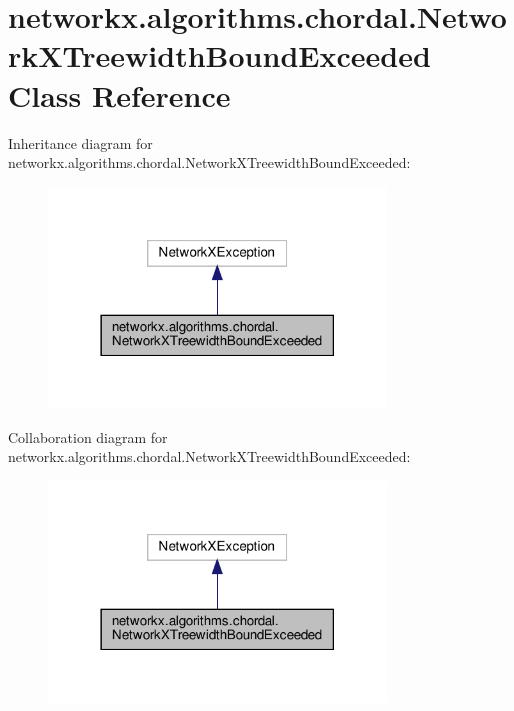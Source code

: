\hypertarget{classnetworkx_1_1algorithms_1_1chordal_1_1NetworkXTreewidthBoundExceeded}{}\section{networkx.\+algorithms.\+chordal.\+Network\+X\+Treewidth\+Bound\+Exceeded Class Reference}
\label{classnetworkx_1_1algorithms_1_1chordal_1_1NetworkXTreewidthBoundExceeded}


Inheritance diagram for networkx.\+algorithms.\+chordal.\+Network\+X\+Treewidth\+Bound\+Exceeded\+:
\nopagebreak
\begin{figure}[H]
\begin{center}
\leavevmode
\includegraphics[width=254pt]{classnetworkx_1_1algorithms_1_1chordal_1_1NetworkXTreewidthBoundExceeded__inherit__graph}
\end{center}
\end{figure}


Collaboration diagram for networkx.\+algorithms.\+chordal.\+Network\+X\+Treewidth\+Bound\+Exceeded\+:
\nopagebreak
\begin{figure}[H]
\begin{center}
\leavevmode
\includegraphics[width=254pt]{classnetworkx_1_1algorithms_1_1chordal_1_1NetworkXTreewidthBoundExceeded__coll__graph}
\end{center}
\end{figure}



